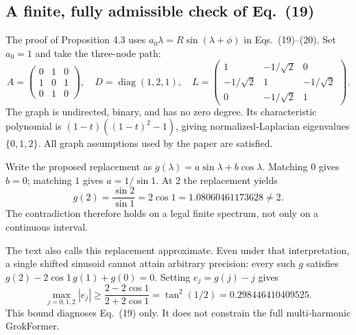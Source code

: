\documentclass[10pt]{article}
\begin{document}
\subsection*{A finite, fully admissible check of Eq. (19)}
The proof of Proposition 4.3 uses \(a_0\lambda=R\sin(\lambda+\phi)\) in Eqs. (19)–(20). Set \(a_0=1\) and take the three-node path: \[A=\begin{pmatrix}0&1&0\\1&0&1\\0&1&0\end{pmatrix},
\quad D=\operatorname{diag}(1,2,1),\quad
L=\begin{pmatrix}1&-1/\sqrt2&0\\-1/\sqrt2&1&-1/\sqrt2\\0&-1/\sqrt2&1\end{pmatrix}.\] The graph is undirected, binary, and has no zero degree. Its characteristic polynomial is \((1-t)((1-t)^2-1)\), giving normalized-Laplacian eigenvalues \(\{0,1,2\}\). All graph assumptions used by the paper are satisfied.\par
Write the proposed replacement as \(g(\lambda)=a\sin\lambda+b\cos\lambda\). Matching \(0\) gives \(b=0\); matching \(1\) gives \(a=1/\sin1\). At \(2\) the replacement yields \[g(2)=\frac{\sin2}{\sin1}=2\cos1=1.08060461173628\neq2.\] The contradiction therefore holds on a legal finite spectrum, not only on a continuous interval.\par
The text also calls this replacement approximate. Even under that interpretation, a single shifted sinusoid cannot attain arbitrary precision: every such \(g\) satisfies \(g(2)-2\cos1\,g(1)+g(0)=0\). Setting \(e_j=g(j)-j\) gives \[\max_{j=0,1,2}|e_j|\geq\frac{2-2\cos1}{2+2\cos1}
=\tan^2(1/2)=0.298446410409525.\] This bound diagnoses Eq. (19) only. It does not constrain the full multi-harmonic GrokFormer.\par
\end{document}
